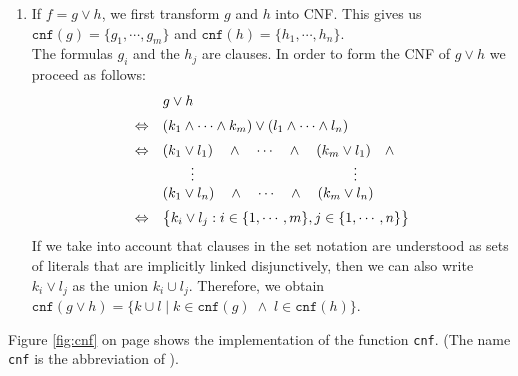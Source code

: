 \begin{enumerate}
\item If $f = g \vee h$, we first transform $g$ and $h$ into CNF.
      This gives us \\[0.2cm]
      \hspace*{1.3cm} 
      $\texttt{cnf}(g) = \{ g_1, \cdots, g_m \}$ \quad and \quad
      $\texttt{cnf}(h) = \{ h_1, \cdots, h_n \}$. \\[0.2cm]
      The formulas $g_i$ and the $h_j$ are clauses.  In order to  form the CNF of $g \vee h$
      we proceed as follows: 
      $$
      \begin{array}[c]{ll}
        & g \vee h \\[0.2cm]
      \Leftrightarrow & (k_1 \wedge \cdots \wedge k_m) \vee (l_1 \wedge \cdots \wedge l_n) \\[0.2cm]
      \Leftrightarrow & (k_1 \vee l_1) \quad \wedge \quad \cdots \quad \wedge \quad (k_m \vee l_1) \quad \wedge \\ 
                      & \qquad \vdots \hspace*{4cm} \vdots \\
                      & (k_1 \vee l_n) \quad \wedge \quad \cdots \quad \wedge \quad (k_m \vee l_n) \\[0.2cm] 
      \Leftrightarrow & \bigl\{ k_i \vee l_j : i \in \{ 1, \cdots, m\}, j \in \{ 1, \cdots, n \} \bigr\} \\ 
      \end{array}
      $$
      If we take into account that clauses in the set notation are understood as sets of
      literals that are implicitly linked disjunctively, then we can also write
      $k_i \vee l_j$ as the union $k_i \cup l_j$.   Therefore, we obtain 
      \\[0.2cm]
      \hspace*{1.3cm} 
      $\texttt{cnf}(g \vee h) = \bigl\{ k \cup l \mid k \in \texttt{cnf}(g) \;\wedge\; l \in \texttt{cnf}(h) \bigr\}$.
\end{enumerate}
Figure \ref{fig:cnf} on page \pageref{fig:cnf} shows the implementation of the function
\texttt{cnf}.
(The name \texttt{cnf} is the abbreviation of ).

